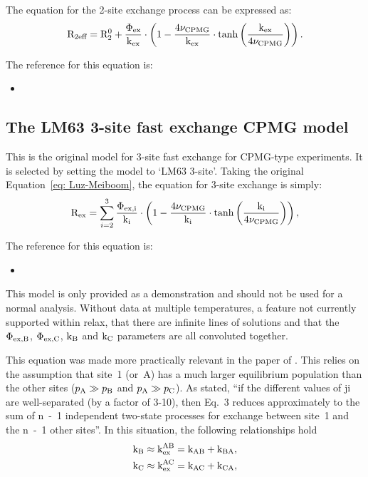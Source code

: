 The equation for the 2-site exchange process can be expressed as:
\begin{equation}
    \mathrm{R}_\textrm{2eff} = \mathrm{R}_2^0 + \frac{\Phi_\textrm{ex}}{\textrm{k}_\textrm{ex}} \cdot \left( 1 - \frac{4\nu_\textrm{CPMG}}{\textrm{k}_\textrm{ex}} \cdot \tanh \left( \frac{\textrm{k}_\textrm{ex}}{4\nu_\textrm{CPMG}} \right) \right) .
\end{equation}

The reference for this equation is:
\begin{itemize}
\item {}
\end{itemize}



\subsection{The LM63 3-site fast exchange CPMG model}
\label{sect: dispersion: LM63 3-site model}

This is the original \citet{LuzMeiboom63} model for 3-site fast exchange for CPMG-type experiments.
It is selected by setting the model to `LM63 3-site'.
Taking the original Equation~\ref{eq: Luz-Meiboom}, the equation for 3-site exchange is simply:
\begin{equation}
    \mathrm{R}_\textrm{ex} = \sum_{i=2}^3 \frac{\Phi_\textrm{ex,i}}{\textrm{k}_\textrm{i}} \cdot \left( 1 - \frac{4\nu_\textrm{CPMG}}{\textrm{k}_\textrm{i}} \cdot \tanh \left( \frac{\textrm{k}_\textrm{i}}{4\nu_\textrm{CPMG}} \right) \right) ,
\end{equation}

The reference for this equation is:
\begin{itemize}
\item {}
\end{itemize}

This model is only provided as a demonstration and should not be used for a normal analysis.
Without data at multiple temperatures, a feature not currently supported within relax, that there are infinite lines of solutions and that the $\Phi_\textrm{ex,B}$, $\Phi_\textrm{ex,C}$, $\textrm{k}_\textrm{B}$ and $\textrm{k}_\textrm{C}$ parameters are all convoluted together.

This equation was made more practically relevant in the paper of \citet{OConnell09}.
This relies on the assumption that site~1 (or~A) has a much larger equilibrium population than the other sites ($p_\textrm{A} \gg p_\textrm{B}$ and $p_\textrm{A} \gg p_\textrm{C}$).
As stated, ``if the different values of ji are well-separated (by a factor of 3-10), then Eq.~3 reduces approximately to the sum of n~-~1 independent two-state processes for exchange between site~1 and the n~-~1 other sites''.
In this situation, the following relationships hold
\begin{subequations}
\begin{align}
    &\textrm{k}_\textrm{B} \approx \textrm{k}_\textrm{ex}^\textrm{AB} = \textrm{k}_\textrm{AB} + \textrm{k}_\textrm{BA} , \\
    &\textrm{k}_\textrm{C} \approx \textrm{k}_\textrm{ex}^\textrm{AC} = \textrm{k}_\textrm{AC} + \textrm{k}_\textrm{CA} ,
\end{align}
\end{subequations}

